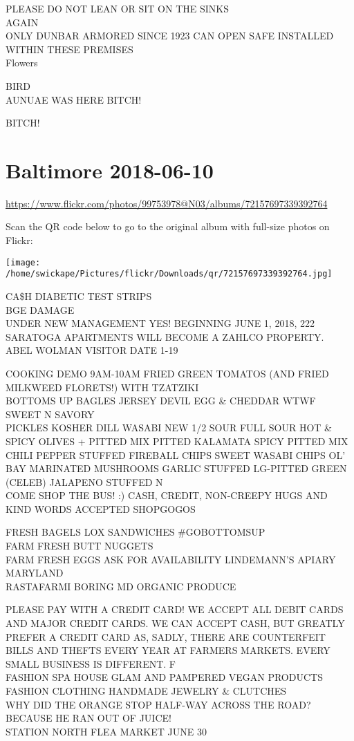 \documentclass[10pt,letterpaper]{article}
\begin{document}
PLEASE DO NOT LEAN OR SIT ON THE SINKS\\
AGAIN\\
ONLY DUNBAR ARMORED SINCE 1923 CAN OPEN SAFE INSTALLED WITHIN THESE PREMISES\\
Flowers

BIRD\\
AUNUAE WAS HERE BITCH!

BITCH!
\pagebreak

\section*{Baltimore 2018-06-10}

\url{https://www.flickr.com/photos/99753978@N03/albums/72157697339392764}

Scan the QR code below to go to the original album with full-size photos on Flickr:

\texttt{[image: /home/swickape/Pictures/flickr/Downloads/qr/72157697339392764.jpg]}
\pagebreak

CA\$H DIABETIC TEST STRIPS\\
BGE DAMAGE\\
UNDER NEW MANAGEMENT YES!  BEGINNING JUNE 1, 2018, 222 SARATOGA APARTMENTS WILL BECOME A ZAHLCO PROPERTY.\\
ABEL WOLMAN VISITOR DATE 1{-}19

COOKING DEMO 9AM{-}10AM FRIED GREEN TOMATOS (AND FRIED MILKWEED FLORETS!) WITH TZATZIKI\\
BOTTOMS UP BAGLES JERSEY DEVIL EGG \& CHEDDAR WTWF SWEET N SAVORY\\
PICKLES KOSHER DILL WASABI NEW 1/2 SOUR FULL SOUR HOT \& SPICY OLIVES + PITTED MIX PITTED KALAMATA SPICY PITTED MIX CHILI PEPPER STUFFED FIREBALL CHIPS SWEET WASABI CHIPS OL' BAY MARINATED MUSHROOMS GARLIC STUFFED LG{-}PITTED GREEN (CELEB) JALAPENO STUFFED N\\
COME SHOP THE BUS!  :) CASH, CREDIT, NON{-}CREEPY HUGS AND KIND WORDS ACCEPTED SHOPGOGOS

FRESH BAGELS LOX SANDWICHES \#GOBOTTOMSUP\\
FARM FRESH BUTT NUGGETS\\
FARM FRESH EGGS ASK FOR AVAILABILITY LINDEMANN'S APIARY MARYLAND\\
RASTAFARMI BORING MD ORGANIC PRODUCE

PLEASE PAY WITH A CREDIT CARD!  WE ACCEPT ALL DEBIT CARDS AND MAJOR CREDIT CARDS.  WE CAN ACCEPT CASH, BUT GREATLY PREFER A CREDIT CARD AS, SADLY, THERE ARE COUNTERFEIT BILLS AND THEFTS EVERY YEAR AT FARMERS MARKETS.  EVERY SMALL BUSINESS IS DIFFERENT.  F\\
FASHION SPA HOUSE GLAM AND PAMPERED VEGAN PRODUCTS FASHION CLOTHING HANDMADE JEWELRY \& CLUTCHES\\
WHY DID THE ORANGE STOP HALF{-}WAY ACROSS THE ROAD?  BECAUSE HE RAN OUT OF JUICE!\\
STATION NORTH FLEA MARKET JUNE 30
\end{document}
